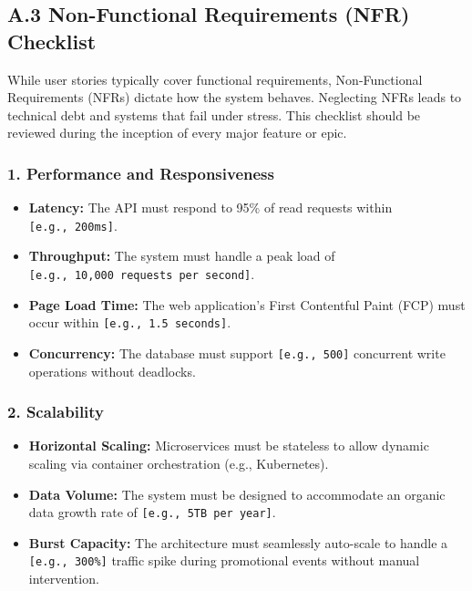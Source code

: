 \documentclass[
  11pt,
  openany,
  oneside]{book}
\providecommand{\tightlist}{%
  \setlength{\itemsep}{0pt}\setlength{\parskip}{0pt}}
\begin{document}
\bigskip

\subsection{A.3 Non-Functional Requirements (NFR)
Checklist}\label{a.3-non-functional-requirements-nfr-checklist}

While user stories typically cover functional requirements,
Non-Functional Requirements (NFRs) dictate how the system behaves.
Neglecting NFRs leads to technical debt and systems that fail under
stress. This checklist should be reviewed during the inception of every
major feature or epic.

\subsubsection{1. Performance and
Responsiveness}\label{performance-and-responsiveness}

\begin{itemize}
\tightlist
\item
  \textbf{Latency:} The API must respond to 95\% of read requests within
  \texttt{{[}e.g.,\ 200ms{]}}.
\item
  \textbf{Throughput:} The system must handle a peak load of
  \texttt{{[}e.g.,\ 10,000\ requests\ per\ second{]}}.
\item
  \textbf{Page Load Time:} The web application's First Contentful Paint
  (FCP) must occur within \texttt{{[}e.g.,\ 1.5\ seconds{]}}.
\item
  \textbf{Concurrency:} The database must support
  \texttt{{[}e.g.,\ 500{]}} concurrent write operations without
  deadlocks.
\end{itemize}

\subsubsection{2. Scalability}\label{scalability}

\begin{itemize}
\tightlist
\item
  \textbf{Horizontal Scaling:} Microservices must be stateless to allow
  dynamic scaling via container orchestration (e.g., Kubernetes).
\item
  \textbf{Data Volume:} The system must be designed to accommodate an
  organic data growth rate of \texttt{{[}e.g.,\ 5TB\ per\ year{]}}.
\item
  \textbf{Burst Capacity:} The architecture must seamlessly auto-scale
  to handle a \texttt{{[}e.g.,\ 300\%{]}} traffic spike during
  promotional events without manual intervention.
\end{itemize}
\end{document}
